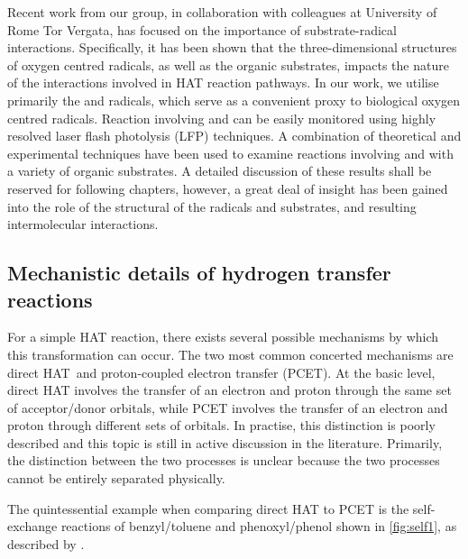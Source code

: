 Recent work from our group, in collaboration with colleagues at University of Rome Tor Vergata, has focused on the importance of substrate-radical interactions. Specifically, it has been shown that the three-dimensional structures of oxygen centred radicals, as well as the organic substrates, impacts the nature of the interactions involved in HAT reaction pathways.\cite{Salamone2015Rev} In our work, we utilise primarily the \bno and \cumo radicals, which serve as a convenient proxy to biological oxygen centred radicals. Reaction involving \bno and \cumo can be easily monitored using highly resolved laser flash photolysis (LFP) techniques. A combination of theoretical and experimental techniques have been used to examine reactions involving \bno and \cumo with a variety of organic substrates. A detailed discussion of these results shall be reserved for following chapters, however, a great deal of insight has been gained into the role of the structural of the radicals and substrates, and resulting intermolecular interactions.

\subsection{Mechanistic details of hydrogen transfer reactions}

For a simple HAT reaction, there exists several possible mechanisms by which this transformation can occur. The two most common concerted mechanisms are direct HAT\footnotemark~and proton-coupled electron transfer (PCET). At the basic level, direct HAT involves the transfer of an electron and proton through the same set of acceptor/donor orbitals, while PCET involves the transfer of an electron and proton through different sets of orbitals. In practise, this distinction is poorly described and this topic is still in active discussion in the literature.\cite{Cukier1998, Mayer2002, Stubbe2003, Mayer2004, DiLabio2007, Huynh2007, HammesSchiffer2008, Mayer2010, Weinberg2012, HammesSchiffer2015, MunozRugeles2017} Primarily, the distinction between the two processes is unclear because the two processes cannot be entirely separated physically.\cite{DiLabio2007}


The quintessential example when comparing direct HAT to PCET is the self-exchange reactions of benzyl/toluene and phenoxyl/phenol shown in \ref{fig:self1}, as described by \citet{Mayer2002}.

